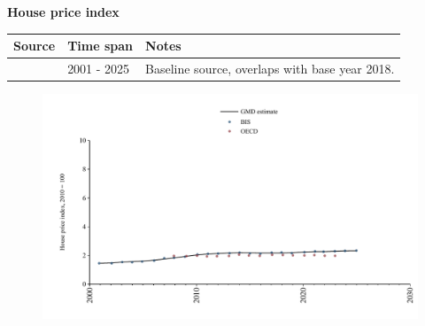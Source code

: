 \documentclass[12pt,a4paper,landscape]{article}
\begin{document}
\begin{adjustbox}{max totalsize={\paperwidth}{\paperheight},center}
\begin{minipage}[t][\textheight][t]{\textwidth}
\vspace*{0.5cm}
{}
\begin{center}
{\Large\bfseries House price index}
\end{center}
\vspace{0.5cm}
\begin{table}[H]
\centering
\small
\begin{tabular}{|l|l|l|}
\hline
\textbf{Source} & \textbf{Time span} & \textbf{Notes} \\
\hline
\rowcolor{white}\cite{BIS}& 2001 - 2025 &Baseline source, overlaps with base year 2018. \\
\hline
\end{tabular}
\end{table}
\begin{figure}[H]
\centering
\includegraphics[width=\textwidth,height=0.6\textheight,keepaspectratio]{graphs/BRA_HPI.pdf}
\end{figure}
\end{minipage}
\end{adjustbox}
\end{document}
